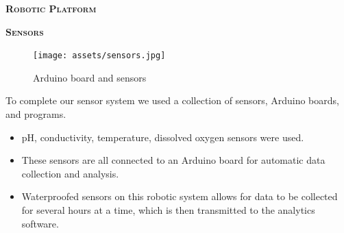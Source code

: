 \documentclass[final,t]{beamer}
\begin{document}
\begin{frame}{}
\begin{columns}
\begin{column}{.5\linewidth}
\begin{block}{\textsc{\textbf{Robotic Platform}}}
                    \vspace*{3mm}
                \end{block}
                \begin{block}{\textsc{\textbf{Sensors}}}
                    \vspace*{3mm}

                    \begin{figure}
                        \centering
                        \texttt{[image: assets/sensors.jpg]}
                        \caption{Arduino board and sensors}
                    \end{figure}
                    To complete our sensor system we used a collection of sensors,
                    Arduino boards, and programs.
                    \begin{itemize}
                    	\item pH, conductivity, temperature, dissolved oxygen sensors
                      were used.
                    	\item These sensors are all connected to an Arduino board
                      for automatic data collection and analysis.
                     	\item Waterproofed sensors on this robotic system allows for
                      data to be collected for several hours at a time, which is
                      then transmitted to the analytics software.
                     \end{itemize}

                    \vspace*{3mm}
                \end{block}


\end{column}
\end{columns}
\end{frame}
\end{document}
